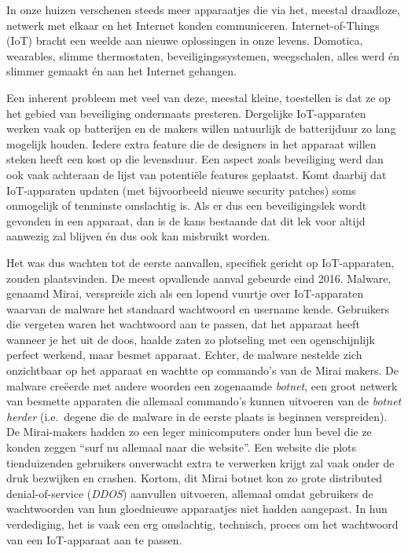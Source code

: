 \documentclass[
  10pt,
  dutch,
  paper=a4,
  ,captions=tableheading
]{scrbook}
\begin{document}
In onze huizen verschenen steeds meer apparaatjes die via het, meestal
draadloze, netwerk met elkaar en het Internet konden communiceren.
Internet-of-Things (IoT) bracht een weelde aan nieuwe oplossingen in
onze levens. Domotica, wearables, slimme thermostaten,
beveiligingssystemen, weegschalen, alles werd én slimmer gemaakt én aan
het Internet gehangen.

Een inherent probleem met veel van deze, meestal kleine, toestellen is
dat ze op het gebied van beveiliging ondermaats presteren. Dergelijke
IoT-apparaten werken vaak op batterijen en de makers willen natuurlijk
de batterijduur zo lang mogelijk houden. Iedere extra feature die de
designers in het apparaat willen steken heeft een kost op die
levensduur. Een aspect zoals beveiliging werd dan ook vaak achteraan de
lijst van potentiële features geplaatst. Komt daarbij dat IoT-apparaten
updaten (met bijvoorbeeld nieuwe security patches) soms onmogelijk of
tenminste omslachtig is. Als er dus een beveiligingslek wordt gevonden
in een apparaat, dan is de kans bestaande dat dit lek voor altijd
aanwezig zal blijven én dus ook kan misbruikt worden.

Het was dus wachten tot de eerste aanvallen, specifiek gericht op
IoT-apparaten, zouden plaatsvinden. De meest opvallende aanval gebeurde
eind 2016. Malware, genaamd Mirai, verspreide zich als een lopend
vuurtje over IoT-apparaten waarvan de malware het standaard wachtwoord
en username kende. Gebruikers die vergeten waren het wachtwoord aan te
passen, dat het apparaat heeft wanneer je het uit de doos, haalde zaten
zo plotseling met een ogenschijnlijk perfect werkend, maar besmet
apparaat. Echter, de malware nestelde zich onzichtbaar op het apparaat
en wachtte op commando's van de Mirai makers. De malware creëerde met
andere woorden een zogenaamde \emph{botnet}, een groot netwerk van
besmette apparaten die allemaal commando's kunnen uitvoeren van de
\emph{botnet herder} (i.e.~degene die de malware in de eerste plaats is
beginnen verspreiden). De Mirai-makers hadden zo een leger minicomputers
onder hun bevel die ze konden zeggen ``surf nu allemaal naar die
website''. Een website die plots tienduizenden gebruikers onverwacht
extra te verwerken krijgt zal vaak onder de druk bezwijken en crashen.
Kortom, dit Mirai botnet kon zo grote distributed denial-of-service
(\emph{DDOS}) aanvullen uitvoeren, allemaal omdat gebruikers de
wachtwoorden van hun gloednieuwe apparaatjes niet hadden aangepast. In
hun verdediging, het is vaak een erg omslachtig, technisch, proces om
het wachtwoord van een IoT-apparaat aan te passen.
\end{document}
